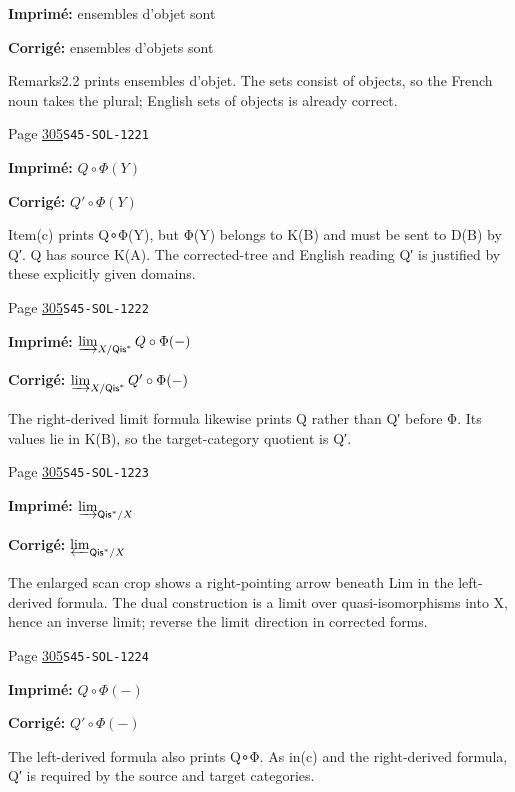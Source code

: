 \begin{description}
\par\noindent\textbf{Imprimé:} ensembles d'objet sont
\par\noindent\textbf{Corrigé:} ensembles d'objets sont
\par\noindent Remarks2.2 prints ensembles d’objet. The sets consist of objects, so the French noun takes the plural; English sets of objects is already correct.
\smallskip
\item[\hypertarget{apparatus:FR-0304}{304}] Page \hyperlink{printpage:fr:305}{305}\quad\texttt{S45-SOL-1221}
\par\noindent\textbf{Imprimé:} $Q\circ \Phi(Y)$
\par\noindent\textbf{Corrigé:} $Q'\circ \Phi(Y)$
\par\noindent Item(c) prints Q∘Φ(Y), but Φ(Y) belongs to K(B) and must be sent to D(B) by Q′. Q has source K(A). The corrected-tree and English reading Q′ is justified by these explicitly given domains.
\smallskip
\item[\hypertarget{apparatus:FR-0305}{305}] Page \hyperlink{printpage:fr:305}{305}\quad\texttt{S45-SOL-1222}
\par\noindent\textbf{Imprimé:} \(\varinjlim_{X/\mathsf{Qis}^\ast} Q\circ\Phi(-)\)
\par\noindent\textbf{Corrigé:} \(\varinjlim_{X/\mathsf{Qis}^\ast} Q'\circ\Phi(-)\)
\par\noindent The right-derived limit formula likewise prints Q rather than Q′ before Φ. Its values lie in K(B), so the target-category quotient is Q′.
\smallskip
\item[\hypertarget{apparatus:FR-0306}{306}] Page \hyperlink{printpage:fr:305}{305}\quad\texttt{S45-SOL-1223}
\par\noindent\textbf{Imprimé:} \(\varinjlim_{\mathsf{Qis}^\ast/X}\)
\par\noindent\textbf{Corrigé:} \(\varprojlim_{\mathsf{Qis}^\ast/X}\)
\par\noindent The enlarged scan crop shows a right-pointing arrow beneath Lim in the left-derived formula. The dual construction is a limit over quasi-isomorphisms into X, hence an inverse limit; reverse the limit direction in corrected forms.
\smallskip
\item[\hypertarget{apparatus:FR-0307}{307}] Page \hyperlink{printpage:fr:305}{305}\quad\texttt{S45-SOL-1224}
\par\noindent\textbf{Imprimé:} \(Q\circ \Phi(-)\)
\par\noindent\textbf{Corrigé:} \(Q'\circ \Phi(-)\)
\par\noindent The left-derived formula also prints Q∘Φ. As in(c) and the right-derived formula, Q′ is required by the source and target categories.

\end{description}
